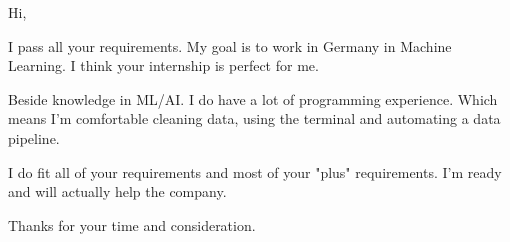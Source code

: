 Hi,

I pass all your requirements. My goal is to work in Germany in Machine Learning. I think your internship is perfect for me.

Beside knowledge in ML/AI. I do have a lot of programming experience. Which means I'm comfortable cleaning data, using the terminal and automating a data pipeline.

I do fit all of your requirements and most of your "plus" requirements. I'm ready and will actually help the company.
  



Thanks for your time and consideration.




